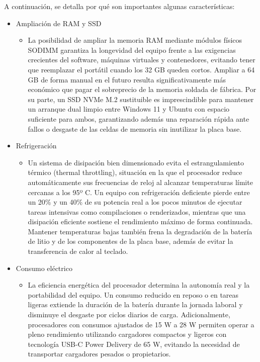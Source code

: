 \documentclass[11.5pt]{article}
\begin{document}
	A continuación, se detalla por qué son importantes algunas características:
	\begin{itemize}
		\item Ampliación de RAM y SSD	
		\begin{itemize}
			\item La posibilidad de ampliar la memoria RAM mediante módulos físicos SODIMM garantiza la longevidad del equipo frente a las exigencias crecientes del software, máquinas virtuales y contenedores, evitando tener que reemplazar el portátil cuando los 32 GB queden cortos. Ampliar a 64 GB de forma manual en el futuro resulta significativamente más económico que pagar el sobreprecio de la memoria soldada de fábrica. Por su parte, un SSD NVMe M.2 sustituible es imprescindible para mantener un arranque dual limpio entre Windows 11 y Ubuntu con espacio suficiente para ambos, garantizando además una reparación rápida ante fallos o desgaste de las celdas de memoria sin inutilizar la placa base.
		\end{itemize}
		\item 	Refrigeración
		\begin{itemize}
			\item Un sistema de disipación bien dimensionado evita el estrangulamiento térmico (thermal throttling), situación en la que el procesador reduce automáticamente sus frecuencias de reloj al alcanzar temperaturas límite cercanas a los 95º C. Un equipo con refrigeración deficiente pierde entre un 20\% y un 40\% de su potencia real a los pocos minutos de ejecutar tareas intensivas como compilaciones o renderizados, mientras que una disipación eficiente sostiene el rendimiento máximo de forma continuada. Mantener temperaturas bajas también frena la degradación de la batería de litio y de los componentes de la placa base, además de evitar la transferencia de calor al teclado.
		\end{itemize}
		\item 	Consumo eléctrico
		\begin{itemize}
			\item La eficiencia energética del procesador determina la autonomía real y la portabilidad del equipo. Un consumo reducido en reposo o en tareas ligeras extiende la duración de la batería durante la jornada laboral y disminuye el desgaste por ciclos diarios de carga. Adicionalmente, procesadores con consumos ajustados de 15 W a 28 W permiten operar a pleno rendimiento utilizando cargadores compactos y ligeros con tecnología USB-C Power Delivery de 65 W, evitando la necesidad de transportar cargadores pesados o propietarios.

\end{itemize}
\end{itemize}
\end{document}
